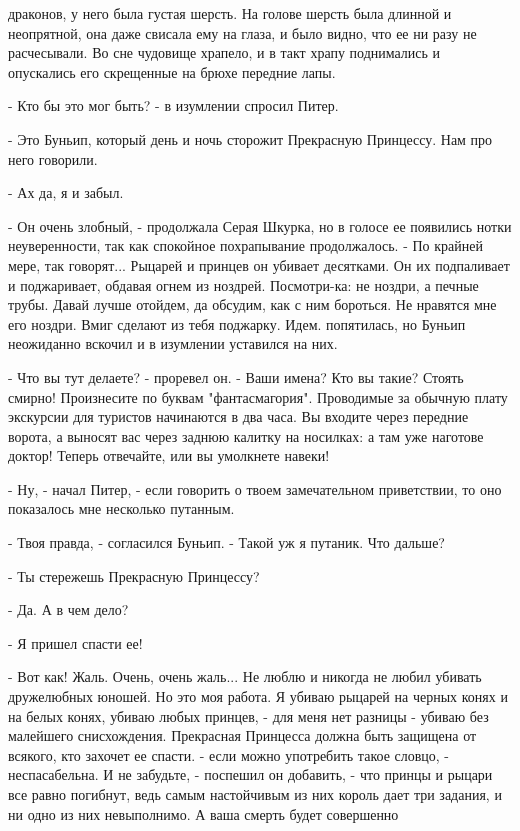 драконов, у него была густая шерсть. На голове шерсть была длинной и 
неопрятной, она даже свисала ему на глаза, и было видно, что ее ни 
разу не расчесывали. Во сне чудовище храпело, и в такт храпу 
поднимались и опускались его скрещенные на брюхе передние лапы.
\par- Кто бы это мог быть? - в изумлении спросил Питер.
\par- Это Буньип, который день и ночь сторожит Прекрасную Принцессу. 
Нам про него говорили.
\par- Ах да, я и забыл.
\par- Он очень злобный, - продолжала Серая Шкурка, но в голосе ее 
появились нотки неуверенности, так как спокойное похрапывание 
продолжалось. - По крайней мере, так говорят... Рыцарей и принцев он 
убивает десятками. Он их подпаливает и поджаривает, обдавая огнем из 
ноздрей. Посмотри-ка: не ноздри, а печные трубы. Давай лучше отойдем, 
да обсудим, как с ним бороться. Не нравятся мне его ноздри. Вмиг 
сделают из тебя поджарку. Идем.
 попятилась, но Буньип неожиданно вскочил и в изумлении 
уставился на них.
\par- Что вы тут делаете? - проревел он. - Ваши имена? Кто вы такие? 
Стоять смирно! Произнесите по буквам "фантасмагория". Проводимые за 
обычную плату экскурсии для туристов начинаются в два часа. Вы входите 
через передние ворота, а выносят вас через заднюю калитку на носилках: 
а там уже наготове доктор! Теперь отвечайте, или вы умолкнете навеки!
\par- Ну, - начал Питер, - если говорить о твоем замечательном 
приветствии, то оно показалось мне несколько путанным.
\par- Твоя правда, - согласился Буньип. - Такой уж я путаник. Что 
дальше?
\par- Ты стережешь Прекрасную Принцессу?
\par- Да. А в чем дело?
\par- Я пришел спасти ее!
\par- Вот как! Жаль. Очень, очень жаль... Не люблю и никогда не любил 
убивать дружелюбных юношей. Но это моя работа. Я убиваю рыцарей на 
черных конях и на белых конях, убиваю любых принцев, - для меня нет 
разницы - убиваю без малейшего снисхождения. Прекрасная Принцесса 
должна быть защищена от всякого, кто захочет ее спасти.
 - если можно употребить такое словцо, - неспасабельна. И не 
забудьте, - поспешил он добавить, - что принцы и рыцари все равно 
погибнут, ведь самым настойчивым из них король дает три задания, и ни 
одно из них невыполнимо. А ваша смерть будет совершенно 
